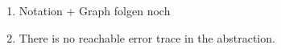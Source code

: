 \begin{enumerate}
\item

Notation + Graph folgen noch

\item
There is no reachable error trace in the abstraction.
\end{enumerate}